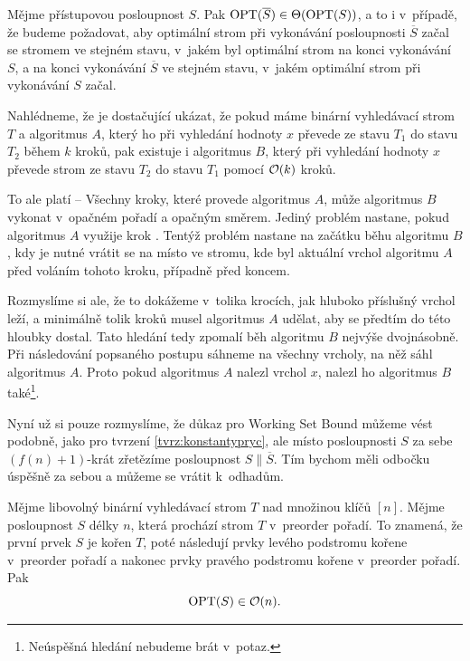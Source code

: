 \begin{lemma}
Mějme přístupovou posloupnost $S$. Pak $\operatorname{OPT}(\overline S) \in \Theta(\operatorname{OPT}(S))$, a to i v~případě, že budeme požadovat, aby optimální strom při vykonávání posloupnosti $\overline{S}$ začal se stromem ve stejném stavu, v~jakém byl optimální strom na konci vykonávání $S$, a na konci vykonávání $\overline S$ ve stejném stavu, v~jakém optimální strom při vykonávání $S$ začal.
\end{lemma}

\begin{dukaz}
Nahlédneme, že je dostačující ukázat, že pokud máme binární vyhledávací strom $T$ a
algoritmus $A$, který ho při vyhledání hodnoty $x$ převede ze stavu $T_1$ do stavu
$T_2$ během $k$ kroků, pak existuje i algoritmus $B$, který při vyhledání hodnoty
$x$ převede strom ze stavu $T_2$ do stavu $T_1$ pomocí $\mathcal O(k)$ kroků.

To ale platí -- Všechny kroky, které provede algoritmus $A$, může algoritmus $B$
vykonat v~opačném pořadí a opačným směrem. Jediný problém nastane, pokud
algoritmus $A$ využije krok . Tentýž problém nastane na
začátku běhu algoritmu $B$, kdy je nutné vrátit se na místo ve stromu, kde byl
aktuální vrchol algoritmu $A$ před voláním tohoto kroku, případně před koncem.

Rozmyslíme si ale, že to dokážeme v~tolika krocích, jak hluboko příslušný
vrchol leží, a minimálně tolik kroků musel algoritmus $A$ udělat, aby se předtím
do této hloubky dostal. Tato hledání tedy zpomalí běh algoritmu $B$ nejvýše
dvojnásobně. Při následování popsaného postupu sáhneme na všechny vrcholy, na něž
sáhl algoritmus $A$. Proto pokud algoritmus $A$ nalezl vrchol $x$, nalezl ho
algoritmus $B$ také\footnote{Neúspěšná hledání nebudeme brát v~potaz.}.
\end{dukaz}

Nyní už si pouze rozmyslíme, že důkaz pro Working Set Bound můžeme vést
podobně, jako pro tvrzení \ref{tvrz:konstantypryc}, ale místo posloupnosti $S$ za sebe
$(f(n)+1)$-krát zřetězíme posloupnost $S\|\overline S$. Tím bychom měli odbočku
úspěšně za sebou a můžeme se vrátit k~odhadům. 

\begin{veta}
Mějme libovolný binární vyhledávací strom $T$ nad množinou klíčů $[n]$. Mějme posloupnost $S$ délky $n$, která prochází strom $T$ v~preorder pořadí. To znamená, že první prvek $S$ je kořen $T$, poté následují prvky levého podstromu kořene v~preorder pořadí a nakonec prvky pravého podstromu kořene v~preorder pořadí. Pak $$\operatorname{OPT}(S)\in \mathcal O(n).$$
\end{veta}

